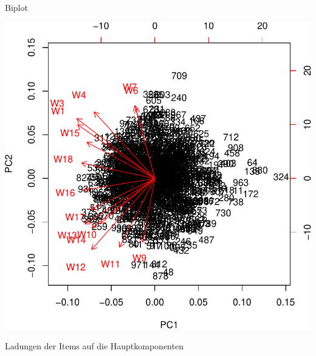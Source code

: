 \begin{frame}[fragile]{Biplot}

\begin{Shaded}
\begin{Highlighting}[]
\end{Highlighting}
\end{Shaded}

\begin{center}\includegraphics[width=0.5\linewidth]{PraDa_Folien_nm_2_files/figure-beamer/unnamed-chunk-28-1} \end{center}

\end{frame}

\begin{frame}[fragile]{Ladungen der Items auf die Hauptkomponenten}

\begin{Shaded}
\begin{Highlighting}[]
\StringTok{ } \NormalTok{, } \NormalTok{)}
\end{Highlighting}
\end{Shaded}

\end{frame}

